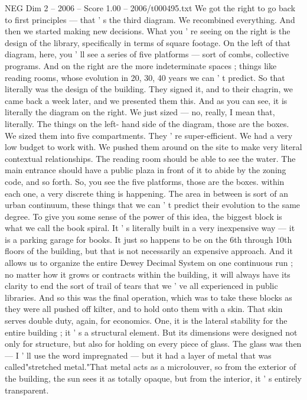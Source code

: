 \begin{textsample}{NEG Dim 2 – 2006 – Score 1.00 – 2006/t000495.txt}
We got the right to go back to first principles — that ' s the third diagram.
We recombined everything.
And then we started making new decisions.
What you ' re seeing on the right is the design of the library, specifically in terms of square footage.
On the left of that diagram, here, you ' ll see a series of five platforms — sort of combs, collective programs.
And on the right are the more indeterminate spaces ; things like reading rooms, whose evolution in 20, 30, 40 years we can ' t predict.
So that literally was the design of the building.
They signed it, and to their chagrin, we came back a week later, and we presented them this.
And as you can see, it is literally the diagram on the right.
We just sized — no, really, I mean that, literally.
The things on the left- hand side of the diagram, those are the boxes.
We sized them into five compartments.
They ' re super-efficient.
We had a very low budget to work with.
We pushed them around on the site to make very literal contextual relationships.
The reading room should be able to see the water.
The main entrance should have a public plaza in front of it to abide by the zoning code, and so forth.
So, you see the five platforms, those are the boxes. within each one, a very discrete thing is happening.
The area in between is sort of an urban continuum, these things that we can ' t predict their evolution to the same degree.
To give you some sense of the power of this idea, the biggest block is what we call the book spiral.
It ' s literally built in a very inexpensive way — it is a parking garage for books.
It just so happens to be on the 6th through 10th floors of the building, but that is not necessarily an expensive approach.
And it allows us to organize the entire Dewey Decimal System on one continuous run ; no matter how it grows or contracts within the building, it will always have its clarity to end the sort of trail of tears that we ' ve all experienced in public libraries.
And so this was the final operation, which was to take these blocks as they were all pushed off kilter, and to hold onto them with a skin.
That skin serves double duty, again, for economics.
One, it is the lateral stability for the entire building ; it ' s a structural element.
But its dimensions were designed not only for structure, but also for holding on every piece of glass.
The glass was then — I ' ll use the word impregnated — but it had a layer of metal that was called"stretched metal."That metal acts as a microlouver, so from the exterior of the building, the sun sees it as totally opaque, but from the interior, it ' s entirely transparent.

\end{textsample}
